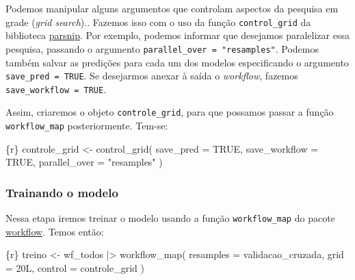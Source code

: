 \documentclass[
  letterpaper,
  DIV=11,
  numbers=noendperiod,
  oneside]{scrartcl}
\newenvironment{Shaded}{\begin{snugshade}}{\end{snugshade}}
\newcommand{\AttributeTok}[1]{\textcolor[rgb]{0.40,0.45,0.13}{#1}}
\newcommand{\ConstantTok}[1]{\textcolor[rgb]{0.56,0.35,0.01}{#1}}
\newcommand{\FunctionTok}[1]{\textcolor[rgb]{0.28,0.35,0.67}{#1}}
\newcommand{\InformationTok}[1]{\textcolor[rgb]{0.37,0.37,0.37}{#1}}
\newcommand{\NormalTok}[1]{\textcolor[rgb]{0.00,0.23,0.31}{#1}}
\newcommand{\OtherTok}[1]{\textcolor[rgb]{0.00,0.23,0.31}{#1}}
\newcommand{\SpecialCharTok}[1]{\textcolor[rgb]{0.37,0.37,0.37}{#1}}
\newcommand{\StringTok}[1]{\textcolor[rgb]{0.13,0.47,0.30}{#1}}
\begin{document}
Podemos manipular alguns argumentos que controlam aspectos da pesquisa
em grade (\emph{grid search}).. Fazemos isso com o uso da função
\texttt{control\_grid} da biblioteca
\href{https://parsnip.tidymodels.org/}{parsnip}. Por exemplo, podemos
informar que desejamos paralelizar essa pesquisa, passando o argumento
\texttt{parallel\_over\ =\ "resamples"}. Podemos também salvar as
predições para cada um dos modelos especificando o argumento
\texttt{save\_pred\ =\ TRUE}. Se desejarmos anexar à saída o
\emph{workflow}, fazemos \texttt{save\_workflow\ =\ TRUE}.

Assim, criaremos o objeto \texttt{controle\_grid}, para que possamos
passar a função \texttt{workflow\_map} posteriormente. Tem-se:

\begin{Shaded}
\begin{Highlighting}[]
\InformationTok{\textasciigrave{}\textasciigrave{}\textasciigrave{}\{r\}}
\NormalTok{controle\_grid }\OtherTok{\textless{}{-}} \FunctionTok{control\_grid}\NormalTok{(}
  \AttributeTok{save\_pred =} \ConstantTok{TRUE}\NormalTok{,}
  \AttributeTok{save\_workflow =} \ConstantTok{TRUE}\NormalTok{,}
  \AttributeTok{parallel\_over =} \StringTok{"resamples"}
\NormalTok{)}
\InformationTok{\textasciigrave{}\textasciigrave{}\textasciigrave{}}
\end{Highlighting}
\end{Shaded}

\hypertarget{trainando-o-modelo}{%
\subsubsection{Trainando o modelo}\label{trainando-o-modelo}}

Nessa etapa iremos treinar o modelo usando a função
\texttt{workflow\_map} do pacote
\href{https://workflows.tidymodels.org}{workflow}. Temos então:

\begin{Shaded}
\begin{Highlighting}[]
\InformationTok{\textasciigrave{}\textasciigrave{}\textasciigrave{}\{r\}}
\NormalTok{treino }\OtherTok{\textless{}{-}}
\NormalTok{  wf\_todos }\SpecialCharTok{|\textgreater{}} 
  \FunctionTok{workflow\_map}\NormalTok{(}
    \AttributeTok{resamples =}\NormalTok{ validacao\_cruzada,}
    \AttributeTok{grid =}\NormalTok{ 20L,}
    \AttributeTok{control =}\NormalTok{ controle\_grid}
\NormalTok{  )}
\InformationTok{\textasciigrave{}\textasciigrave{}\textasciigrave{}}
\end{Highlighting}
\end{Shaded}
\end{document}
